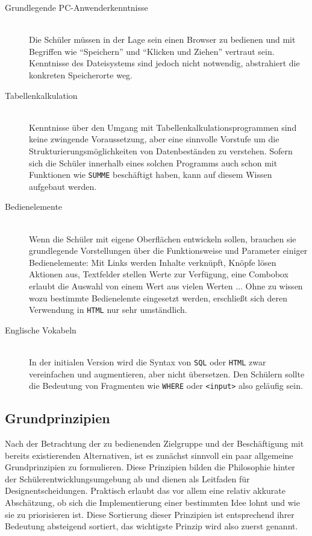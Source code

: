 \begin{description}
\item[Grundlegende PC-Anwenderkenntnisse] \hfill\\
  Die Schüler müssen in der Lage sein einen Browser zu bedienen und mit Begriffen wie "`Speichern"' und "`Klicken und Ziehen"' vertraut sein. Kenntnisse des Dateisystems sind jedoch nicht notwendig, \idename{} abstrahiert die konkreten Speicherorte weg.
\item[Tabellenkalkulation] \hfill\\
  Kenntnisse über den Umgang mit Tabellenkalkulationsprogrammen sind keine zwingende Voraussetzung, aber eine sinnvolle Vorstufe um die Strukturierungsmöglichkeiten von Datenbeständen zu verstehen. Sofern sich die Schüler innerhalb eines solchen Programms auch schon mit Funktionen wie \texttt{SUMME} beschäftigt haben, kann auf diesem Wissen aufgebaut werden.
\item[Bedienelemente] \hfill\\
  Wenn die Schüler mit \idename{} eigene Oberflächen entwickeln sollen, brauchen sie grundlegende Vorstellungen über die Funktionsweise und Parameter einiger Bedienelemente: Mit Links werden Inhalte verknüpft, Knöpfe lösen Aktionen aus, Textfelder stellen Werte zur Verfügung, eine Combobox erlaubt die Auswahl von einem Wert aus vielen Werten ... Ohne zu wissen wozu bestimmte Bedienelemte eingesetzt werden, erschließt sich deren Verwendung in \texttt{HTML} nur sehr umständlich.
\item[Englische Vokabeln] \hfill\\
  In der initialen Version wird \idename{} die Syntax von \texttt{SQL} oder \texttt{HTML} zwar vereinfachen und augmentieren, aber nicht übersetzen. Den Schülern sollte die Bedeutung von Fragmenten wie \texttt{WHERE} oder \texttt{<input>} also geläufig sein.
\end{description}

\subsection{Grundprinzipien}
\label{sec:principles}

Nach der Betrachtung der zu bedienenden Zielgruppe und der Beschäftigung mit bereits existierenden Alternativen, ist es zunächst sinnvoll ein paar allgemeine Grundprinzipien zu formulieren. Diese Prinzipien bilden die Philosophie hinter der Schülerentwicklungsumgebung ab und dienen als Leitfaden für Designentscheidungen. Praktisch erlaubt das vor allem eine relativ akkurate Abschätzung, ob sich die Implementierung einer bestimmten Idee lohnt und wie sie zu priorisieren ist. Diese Sortierung dieser Prinzipien ist entsprechend ihrer Bedeutung absteigend sortiert, das wichtigste Prinzip wird also zuerst genannt.

